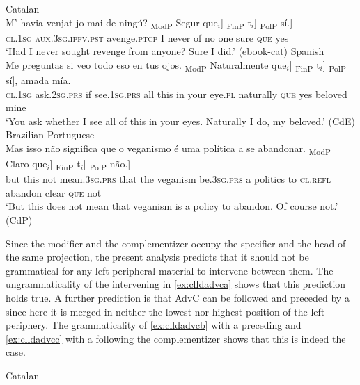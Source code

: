 \ea 
\ea
Catalan\\
\gll  M' havia venjat jo mai de ningú? {\ob}\textsubscript{ModP} Segur que$_i$] {\ob}\textsubscript{FinP} t$_i$] {\ob}\textsubscript{PolP} sí.] \\
\textsc{cl.1sg} \textsc{aux.3sg.ipfv.pst} avenge.\textsc{ptcp} I never of {no one} {} sure \textsc{que} {} {} {} yes\\
\glt `Had I never sought revenge from anyone?  Sure I did.' (ebook-cat)
\ex
		Spanish\\
\gll Me preguntas si veo todo eso en tus ojos. {\ob}\textsubscript{ModP} Naturalmente que$_i$] {\ob}\textsubscript{FinP} t$_i$] {\ob}\textsubscript{PolP} sí],  amada mía.  \\
\textsc{cl.1sg} ask.\textsc{2sg.prs} if see.\textsc{1sg.prs} all this in your eye.\textsc{pl} {} naturally \textsc{que} {} {} {} yes beloved mine\\
\glt `You ask whether I see all of this in your eyes. Naturally I do, my beloved.' (CdE)
\ex Brazilian Portuguese\\
\gll  Mas isso não significa que o veganismo é uma política a se abandonar. {\ob}\textsubscript{ModP} Claro que$_i$] {\ob}\textsubscript{FinP} t$_i$] {\ob}\textsubscript{PolP}  não.] \\
but this not mean.\textsc{3sg.prs} that the veganism be.\textsc{3sg.prs} a politics to \textsc{cl.refl} abandon {} clear \textsc{que} {} {} {} not\\
\glt `But this does not mean that veganism is a policy to abandon. Of course not.'  (CdP) 
\z
\z








Since the modifier and the complementizer  occupy the specifier and the head of the same projection, the present analysis predicts that it should not be grammatical for any  left-peripheral material to intervene between them. The ungrammaticality of the intervening  in \eqref{ex:clldadvca} shows that this prediction holds true. A further prediction is that  AdvC can be followed and preceded by a  since here it is  merged in neither  the lowest nor highest position of the left periphery. The grammaticality of  \eqref{ex:clldadvcb} with a preceding  and  \eqref{ex:clldadvcc} with a  following the complementizer shows that this is indeed the case.




\ea \label{ex:clldadvc} Catalan
\ea\label{ex:clldadvca}

